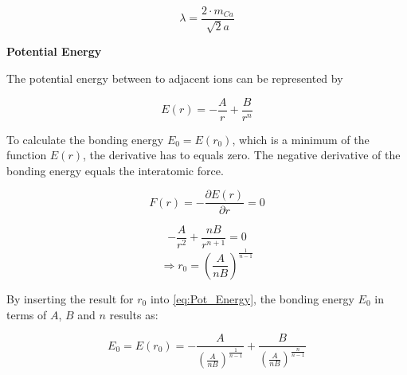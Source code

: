 $$\lambda = \frac{2 \cdot m_{Ca}}{\sqrt{2}a}$$

\textbf{Potential Energy}

The potential energy between to adjacent ions can be represented by

\begin{equation}
	E(r) = - \frac{A}{r} + \frac{B}{r^n}
	\label{eq:Pot_Energy}
\end{equation}

To calculate the bonding energy $E_0 = E(r_0)$, which is a minimum of the function $E(r)$,
the derivative has to equals zero.
The negative derivative of the bonding energy equals the interatomic force.

$$F(r) = - \frac{\partial E(r)}{\partial r} = 0$$

$$-\frac{A}{r^2} + \frac{nB}{r^{n+1}} = 0$$
$$\Rightarrow r_0 = \left( \frac{A}{nB} \right)^{\frac{1}{n-1}}$$

By inserting the result for $r_0$ into \autoref{eq:Pot_Energy}, the bonding energy $E_0$ in terms of $A$, $B$ and $n$ results as:

$$E_0 = E(r_0) = - \frac{A}{\left( \frac{A}{nB} \right)^{\frac{1}{n-1}}} + 
				\frac{B}{\left( \frac{A}{nB} \right)^{\frac{n}{n-1}}}$$